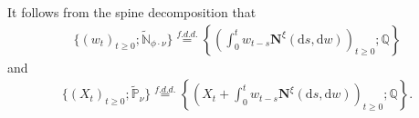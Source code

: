 \documentclass[12pt,a4paper]{amsart}
\numberwithin{equation}{section}
\theoremstyle{plain}
\newtheorem{lem}[thm]{Lemma}
\theoremstyle{definition}
\theoremstyle{remark}
\begin{document}
\begin{comment} 
Now we show that the process $\{(Z_t)_{t\ge0}, \mathbb Q_\nu\}$ is stochastically non-decreasing. For this, we construct processes $\{(\xi_t)_{t\in\mathbb R}, \mathbf N^\xi, (X_t)_{t\ge 0}; \mathbb Q\}$
as follows:
\begin{itemize}
\item $\{(\xi_t)_{t\in\mathbb R}; \mathbb Q\}$ is a two-sided stationary Markov process with
$\{(\xi_t)_{t\ge0}; \mathbb Q\}\overset{f.d.d.}{=}\{(\xi_t)_{t\ge0}; \widetilde \Pi_{\phi\cdot\nu}\}$;
\item Conditioned on $\{(\xi_t)_{t\in\mathbb R}; \mathbb Q\}$, $\{(\mathbf N^\xi; \mathbb Q\}$ is a Poisson random measure on $\mathbb R\times \mathbb D$ with intensity
\begin{align}\label{e:newimmigration}
2\sigma(\xi_s^2){\mathrm d}s\cdot\mathbb N_{\xi_s}({\mathrm d}w)+
{\mathrm d}s\cdot\int_{(0, \infty)}y\mathbb P_{y\delta_{\xi_s}}({\mathrm d}w)\pi(\xi_s, {\mathrm d}y), \quad s\in \mathbb R, w\in \mathbb D;
\end{align}
\item $\{(X_t)_{t\ge 0}; \mathbb Q\}$ is a copy of the superprocess $\{(X_t)_{t\ge 0}; \mathbb P_\nu\}$, and is independent of $\{(\xi_t)_{t\in\mathbb R}, \mathbf N^\xi\}$.
\end{itemize}
\end{comment}
It follows from the spine decomposition that
\begin{align}\label{e:newspine1}
\{(w_t)_{t\ge 0}; \widetilde{\mathbb N}_{\phi\cdot\nu}\}\overset{f.d.d.}{=}\left\{\left(\int^t_0w_{t-s}\mathbf N^\xi({\mathrm d}s, {\mathrm d}w)\right)_{t\ge 0}; \mathbb Q
\right\}
\end{align}
and
\begin{align}\label{e:newspine2}
\{(X_t)_{t\ge 0}; \widetilde {\mathbb P}_\nu\}\overset{f.d.d.}{=}\left\{\left(X_t+\int^t_0w_{t-s}\mathbf N^\xi({\mathrm d}s, {\mathrm d}w)\right)_{t\ge 0}; \mathbb Q
\right\}.
\end{align}
\begin{comment}
\begin{lem}\label{stoch-increas}
The process $\{(w_t(\phi))_{t\ge0}; \widetilde{\mathbb N}_{\phi\cdot\nu}\}$ is stochastically non-decreasing.
\end{lem}

\begin{proof} Note that for any $t\ge 0$,
\begin{align*}
\{w_t(\phi);  \widetilde{\mathbb N}_{\phi\cdot\nu}\}\overset{d.}{=}\left\{\int^t_0w_{t-s}\mathbf N^\xi({\mathrm d}s, {\mathrm d}w); \mathbb Q\right\}
\overset{d.}{=}\left\{\int^0_{-t}w_{-s}\mathbf N^\xi({\mathrm d}s, {\mathrm d}w); \mathbb Q\right\},
\end{align*}
where the second equality follows from the stationarity of $\{(\xi_t)_{t\in\mathbb R}; \mathbb Q\}$. It is obvious that
\[
t\mapsto \int^0_{-t}w_{-s}\mathbf N^\xi({\mathrm d}s, {\mathrm d}w)
\]
is non-decreasing.
\end{proof}
\end{comment}
\end{document}

